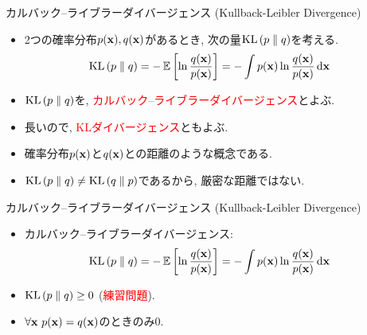 \documentclass[dvipdfmx,notheorems,t]{beamer}
\begin{document}
\begin{frame}{カルバック--ライブラーダイバージェンス (Kullback-Leibler Divergence)}
\begin{itemize}
  \item 2つの確率分布$p(\vb{x}), q(\vb{x})$があるとき, 次の量$\operatorname{KL} \left( p \parallel q \right)$を考える.
  \begin{align*}
    \operatorname{KL} \left( p \parallel q \right) &= -\operatorname{\mathbb{E}} \left[ \ln \frac{q(\vb{x})}{p(\vb{x})} \right]
      = -\int p(\vb{x}) \ln \frac{q(\vb{x})}{p(\vb{x})} \dd{\vb{x}}
  \end{align*}
  \item $\operatorname{KL} \left( p \parallel q \right)$を, \textcolor{red}{カルバック--ライブラーダイバージェンス}とよぶ.
  \item 長いので, \textcolor{red}{KLダイバージェンス}ともよぶ.
  \item 確率分布$p(\vb{x})$と$q(\vb{x})$との距離のような概念である.
  \item $\operatorname{KL} \left( p \parallel q \right) \neq \operatorname{KL} \left( q \parallel p \right)$であるから, 厳密な距離ではない.
\end{itemize}
\end{frame}

\begin{frame}{カルバック--ライブラーダイバージェンス (Kullback-Leibler Divergence)}
\begin{itemize}
  \item カルバック--ライブラーダイバージェンス:
  \begin{align*}
    \operatorname{KL} \left( p \parallel q \right) &= -\operatorname{\mathbb{E}} \left[ \ln \frac{q(\vb{x})}{p(\vb{x})} \right]
      = -\int p(\vb{x}) \ln \frac{q(\vb{x})}{p(\vb{x})} \dd{\vb{x}}
  \end{align*}
  \item $\operatorname{KL} \left( p \parallel q \right) \ge 0$ (\textcolor{red}{練習問題}).
  \item $\forall \vb{x} \ p(\vb{x}) = q(\vb{x})$のときのみ$0$.
\end{itemize}
\end{frame}
\end{document}
